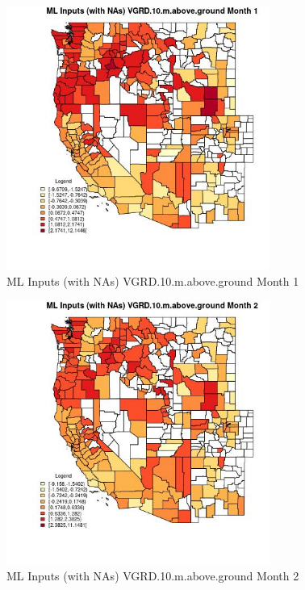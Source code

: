 \begin{figure} 
\centering  
\includegraphics[width=0.77\textwidth]{Code_Outputs/Report_ML_input_PM25_Step4_part_e_de_duplicated_aves_compiled_2019-05-21wNAs_CountyVGRD10mabovegroundmedianMonth1.jpg} 
\caption{\label{fig:Report_ML_input_PM25_Step4_part_e_de_duplicated_aves_compiled_2019-05-21wNAsCountyVGRD10mabovegroundmedianMonth1}ML Inputs (with NAs) VGRD.10.m.above.ground Month 1} 
\end{figure} 
 

\begin{figure} 
\centering  
\includegraphics[width=0.77\textwidth]{Code_Outputs/Report_ML_input_PM25_Step4_part_e_de_duplicated_aves_compiled_2019-05-21wNAs_CountyVGRD10mabovegroundmedianMonth2.jpg} 
\caption{\label{fig:Report_ML_input_PM25_Step4_part_e_de_duplicated_aves_compiled_2019-05-21wNAsCountyVGRD10mabovegroundmedianMonth2}ML Inputs (with NAs) VGRD.10.m.above.ground Month 2} 
\end{figure} 
 

